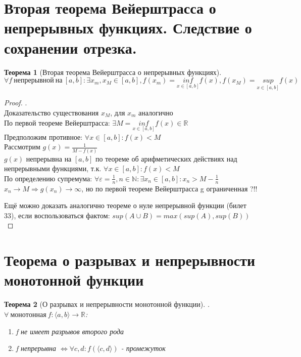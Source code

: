 \documentclass[12pt, a4]{article}
\newtheorem*{theorem}{Теорема}
\renewcommand{\sup}[1]{\underset{#1}{sup}}
\renewcommand{\inf}[1]{\underset{#1}{inf}}
\renewcommand{\implies}{\Rightarrow}
\renewcommand{\iff}{\Leftrightarrow}
\renewcommand{\epsilon}{\varepsilon}
\newcommand{\interval}[1]{\langle#1\rangle}
\newcommand{\R}{\mathbb{R}}
\newcommand{\N}{\mathbb{N}}
\begin{document}
\section{Вторая теорема Вейерштрасса о непрерывных функциях. Следствие о сохранении отрезка.}

\begin{theorem}[Вторая теорема Вейерштрасса о непрерывных функциях]
\[\forall f\ непрерывной\ на\ [a,b]: \exists x_m, x_M \in [a,b], f(x_m) = \inf{x\in[a,b]}f(x), f(x_M) = \sup{x\in[a,b]}f(x)\]
\end{theorem}

\begin{proof}.\\
Доказательство существования $x_M$, для $x_m$ аналогично\\
По первой теореме Вейерштрасса: $\exists M = \inf{x\in[a,b]}f(x) \in \R$\\
Предположим противное: $\forall x \in [a,b]: f(x) < M$\\
Рассмотрим $g(x) = \frac{1}{M-f(x)}$\\
$g(x)$ непрерывна на $[a,b]$ по теореме об арифметических действиях над непрерывными функциями, т.к. $\forall x \in [a,b]: f(x) < M$\\
По определению супремума: $\forall \epsilon = \frac{1}{n}, n\in\N: \exists x_n \in [a,b]: x_n > M - \frac{1}{n}$\\
$x_n \to M \implies g(x_n) \to \infty$, но по первой теореме Вейерштрасса g ограниченная ?!!

Ещё можно доказать аналогично теореме о нуле непрерывной функции (билет 33), если воспользоваться фактом: $sup(A \cup B) = max(sup(A), sup(B))$
\end{proof}

\section{Теорема о разрывах и непрерывности монотонной функции}

\begin{theorem}[О разрывах и непрерывности монотонной функции].\\
$\forall\ монотонная\ f: \interval{a,b}\to\R$:
\begin{enumerate}
    \item f не имеет разрывов второго рода
    \item f непрерывна $\iff \forall c,d: f(\interval{c,d})$ - промежуток
\end{enumerate}
\end{theorem}
\end{document}
